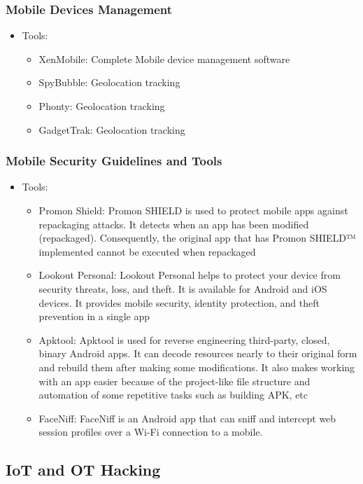 \subsubsection{Mobile Devices Management}
\begin{itemize}
    \item Tools:
    \begin{itemize}
        \item XenMobile: Complete Mobile device management software
        \item SpyBubble: Geolocation tracking
        \item Phonty: Geolocation tracking
        \item GadgetTrak: Geolocation tracking
    \end{itemize}
\end{itemize}
\subsubsection{Mobile Security Guidelines and Tools}
\begin{itemize}
    \item Tools:
    \begin{itemize}
        \item Promon Shield: Promon SHIELD is used to protect mobile apps against repackaging attacks. It detects when an app has been modified (repackaged). Consequently, the original app that has Promon SHIELD™ implemented cannot be executed when repackaged
        \item Lookout Personal: Lookout Personal helps to protect your device from security threats, loss, and theft. It is available for Android and iOS devices. It provides mobile security, identity protection, and theft prevention in a single app
        \item Apktool: Apktool is used for reverse engineering third-party, closed, binary Android apps. It can decode resources nearly to their original form and rebuild them after making some modifications. It also makes working with an app easier because of the project-like file structure and automation of some repetitive tasks such as building APK, etc
        \item FaceNiff: FaceNiff is an Android app that can sniff and intercept web session profiles over a Wi-Fi connection to a mobile.
    \end{itemize}
\end{itemize}

\subsection{IoT and OT Hacking}
